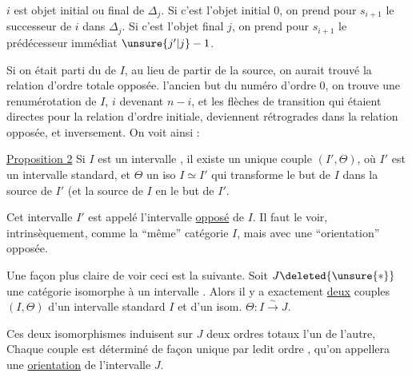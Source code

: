 $i$ est objet initial ou final de $\mathbb{\Delta}_j$. Si c'est l'objet initial $0$, on prend pour $s_{i+1}$ le successeur  de $i$ dans $\mathbb{\Delta}_j$. Si c'est l'objet final $j$, on prend pour $s_{i+1}$ le prédécesseur immédiat $\unsure{j'|j}-1$.

Si on était parti du   de $I$, au lieu de partir de la source, on aurait trouvé la relation d'ordre totale opposée.   l'ancien but du numéro d'ordre $0$, on trouve une renumérotation de $I$, $i$ devenant $n-i$, et les  flèches de transition qui étaient  directes pour la  relation d'ordre initiale, deviennent rétrogrades dans la relation   opposée, et inversement. On voit ainsi :

\uline{Proposition 2} Si $I$ est un intervalle , il existe un unique  couple $(I',\Theta)$, où $I'$ est un intervalle standard, et $\Theta$ un iso $I\simeq I'$ qui transforme le but de $I$ dans la source de $I'$ (et la source de $I$ en le but de $I'$.

Cet intervalle $I'$ est appelé l'intervalle \uline{opposé} de $I$. Il faut le voir, intrinsèquement, comme la ``même'' catégorie $I$, mais avec une ``orientation'' opposée.



Une façon plus claire de voir ceci est la suivante. Soit $J\deleted{\unsure{*}}$ une catégorie  isomorphe à un intervalle . Alors il y a exactement  \uline{deux} couples $(I,\Theta)$ d'un intervalle standard $I$ et d'un isom. $\Theta:I\xrightarrow{\sim}J$.

Ces deux isomorphismes induisent sur $J$ deux ordres  totaux   l'un de l'autre,  Chaque couple est déterminé de façon unique par ledit ordre , qu'on appellera une \uline{orientation} de l'intervalle $J$.



